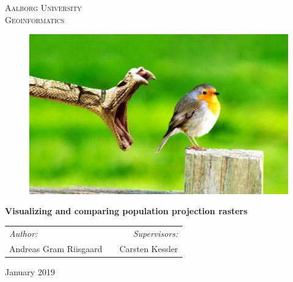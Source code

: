 \thispagestyle{empty}

\begin{center}
\textsc{\LARGE Aalborg University}\\%
\textsc{\Large Geoinformatics}\\[1.cm]
\end{center}

\begin{figure} [H]
	\centering
	\includegraphics[width=1\textwidth]{Pictures/Example.jpg}	
	\label{forside}
\end{figure}

\vfill
\begin{center}
{ \huge \bfseries {Visualizing and comparing population projection rasters}}\\[0.2cm]
\end{center}

\begin{tabularx}{\textwidth}{l X r}
	\hline
	\emph{Author:} & & \emph{Supervisors:}\\
	Andreas Gram Riisgaard	&	 &	 Carsten Kessler \\
	\hline
\end{tabularx}

\vfill

{\large January 2019}

\frontmatter

